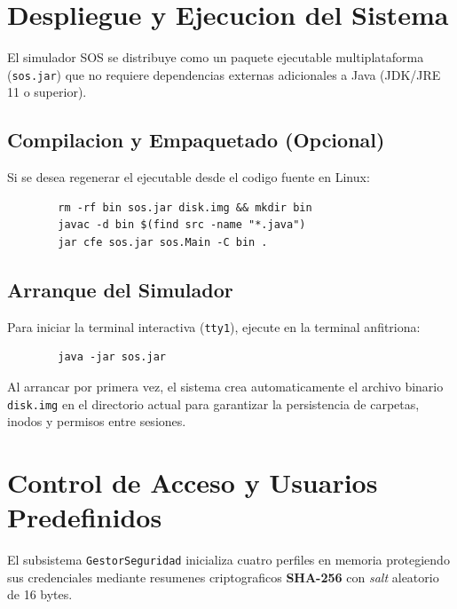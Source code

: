 \documentclass[11pt,a4paper]{article}
\begin{document}
	\section{Despliegue y Ejecucion del Sistema}
	
	El simulador SOS se distribuye como un paquete ejecutable multiplataforma (\texttt{sos.jar}) que no requiere dependencias externas adicionales a Java (JDK/JRE 11 o superior).
	
	\subsection{Compilacion y Empaquetado (Opcional)}
	Si se desea regenerar el ejecutable desde el codigo fuente en Linux:
	\begin{lstlisting}
		rm -rf bin sos.jar disk.img && mkdir bin
		javac -d bin $(find src -name "*.java")
		jar cfe sos.jar sos.Main -C bin .
	\end{lstlisting}
	
	\subsection{Arranque del Simulador}
	Para iniciar la terminal interactiva (\texttt{tty1}), ejecute en la terminal anfitriona:
	\begin{lstlisting}
		java -jar sos.jar
	\end{lstlisting}
	Al arrancar por primera vez, el sistema crea automaticamente el archivo binario \texttt{disk.img} en el directorio actual para garantizar la persistencia de carpetas, inodos y permisos entre sesiones.
	
	\section{Control de Acceso y Usuarios Predefinidos}
	
	El subsistema \texttt{GestorSeguridad} inicializa cuatro perfiles en memoria protegiendo sus credenciales mediante resumenes criptograficos \textbf{SHA-256} con \textit{salt} aleatorio de 16 bytes.
	
\end{document}
